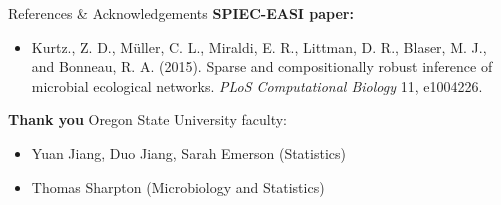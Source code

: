 \documentclass[professionalfonts]{beamer}
\begin{document}
\begin{frame}{References \& Acknowledgements}
\textbf{SPIEC-EASI paper:}
\begin{itemize}
\item Kurtz., Z. D., M{\"u}ller, C. L., Miraldi, E. R., Littman, D. R., Blaser, M. J., and Bonneau, R. A. (2015). Sparse and compositionally robust inference of microbial ecological networks. \textit{PLoS Computational Biology} 11, e1004226.
\end{itemize}

\textbf{Thank you} Oregon State University faculty:
\begin{itemize}
\item Yuan Jiang, Duo Jiang, Sarah Emerson (Statistics)
\item Thomas Sharpton (Microbiology and Statistics)
\end{itemize}
\end{frame}
\end{document}
